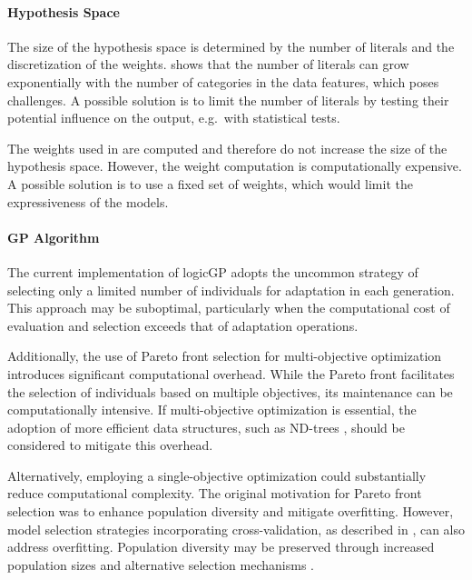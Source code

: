 \documentclass[a4paper,twoside]{article}
\begin{document}
\paragraph{Hypothesis Space}

The size of the hypothesis space is determined by the number of literals and the discretization of the weights. \citet{10.1145/3712255.3734300} shows that the number of literals can grow exponentially with the number of categories in the data features, which poses challenges. A possible solution is to limit the number of literals by testing their potential influence on the output, e.g.\ with statistical tests. 

The weights used in \citet{10.1145/3712255.3734300} are computed and therefore do not increase the size of the hypothesis space. However, the weight computation is computationally expensive. A possible solution is to use a fixed set of weights, which would limit the expressiveness of the models.

\paragraph{GP Algorithm}

The current implementation of logicGP adopts the uncommon strategy of selecting only a limited number of individuals for adaptation in each generation. This approach may be suboptimal, particularly when the computational cost of evaluation and selection exceeds that of adaptation operations.

Additionally, the use of Pareto front selection for multi-objective optimization introduces significant computational overhead. While the Pareto front facilitates the selection of individuals based on multiple objectives, its maintenance can be computationally intensive. If multi-objective optimization is essential, the adoption of more efficient data structures, such as ND-trees \citep{DBLP:journals/corr/JaszkiewiczL16}, should be considered to mitigate this overhead.

Alternatively, employing a single-objective optimization could substantially reduce computational complexity. The original motivation for Pareto front selection was to enhance population diversity and mitigate overfitting. However, model selection strategies incorporating cross-validation, as described in \citet{10.1145/3712255.3734300}, can also address overfitting. Population diversity may be preserved through increased population sizes and alternative selection mechanisms \citep{GOLDBERG199169}.
\end{document}
